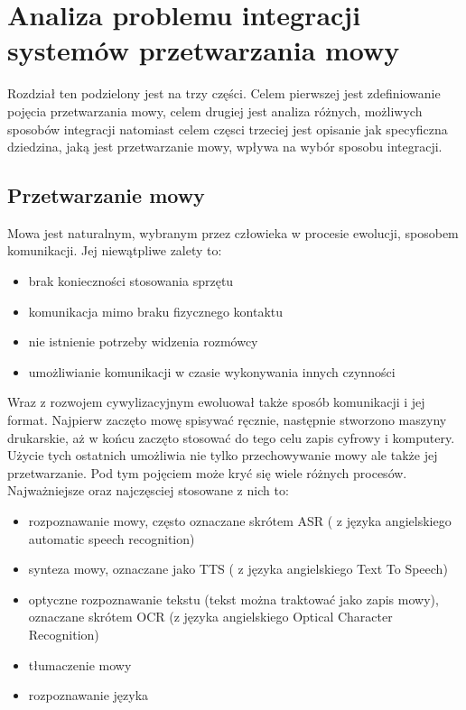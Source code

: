 
\chapter{Analiza problemu integracji systemów przetwarzania mowy} %



\ifpdf
    \graphicspath{{2/figures/PNG/}{2/figures/PDF/}{2/figures/}}
\else
    \graphicspath{{2/figures/EPS/}{2/figures/}}
\fi


Rozdział ten podzielony jest na trzy części. Celem pierwszej jest zdefiniowanie pojęcia przetwarzania mowy, celem drugiej jest analiza różnych, możliwych sposobów integracji natomiast celem częsci trzeciej jest opisanie jak specyficzna dziedzina, jaką jest przetwarzanie mowy, wpływa na wybór sposobu integracji.

\section{Przetwarzanie mowy}
Mowa jest naturalnym, wybranym przez człowieka w procesie ewolucji, sposobem komunikacji. Jej niewątpliwe zalety to:
\begin{itemize}
	\item brak konieczności stosowania sprzętu
	\item komunikacja mimo braku fizycznego kontaktu
	\item nie istnienie potrzeby widzenia rozmówcy
	\item umożliwianie komunikacji w czasie wykonywania innych czynności
\end{itemize}
Wraz z rozwojem cywylizacyjnym ewoluował także sposób komunikacji i jej format. Najpierw zaczęto mowę spisywać ręcznie, następnie stworzono maszyny drukarskie, aż w końcu zaczęto stosować do tego celu zapis cyfrowy i komputery. Użycie tych ostatnich umożliwia nie tylko przechowywanie mowy ale także jej przetwarzanie. Pod tym pojęciem może kryć się wiele różnych procesów. Najważniejsze oraz najczęsciej stosowane z nich to:
\begin{itemize}
	\item rozpoznawanie mowy, często oznaczane skrótem ASR ( z języka angielskiego automatic speech recognition)
	\item synteza mowy, oznaczane jako TTS ( z języka angielskiego Text To Speech)
	\item optyczne rozpoznawanie tekstu (tekst można traktować jako zapis mowy), oznaczane skrótem OCR (z języka angielskiego Optical Character Recognition)
	\item tłumaczenie mowy
	\item rozpoznawanie języka
\end{itemize} 
